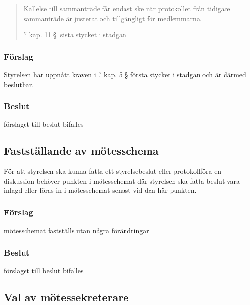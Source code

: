 \documentclass[protokoll]{dvd}
\begin{document}
\blockquote[7 kap. 11 \S~sista stycket i stadgan]{
Kallelse till sammanträde får endast ske när protokollet från tidigare sammanträde är justerat och tillgängligt för medlemmarna.}

\subsubsection*{Förslag}

\begin{attsatser}
    \item Styrelsen har uppnått kraven i 7 kap. 5 § första stycket i stadgan och är därmed beslutbar.
\end{attsatser}
\subsubsection*{Beslut}
\begin{attsatser}
    \item förslaget till beslut bifalles
\end{attsatser}


\subsection{Fastställande av mötesschema}

För att styrelsen ska kunna fatta ett styrelsebeslut eller protokollföra en diskussion behöver punkten i mötesschemat där styrelsen ska fatta beslut vara inlagd eller föras in i mötesschemat senast vid den här punkten.

\subsubsection*{Förslag}

\begin{attsatser}
    \item 
    mötesschemat fastställs utan några förändringar.
\end{attsatser}
\subsubsection*{Beslut}
\begin{attsatser}
    \item förslaget till beslut bifalles
\end{attsatser}

\subsection{Val av mötessekreterare}
\end{document}
